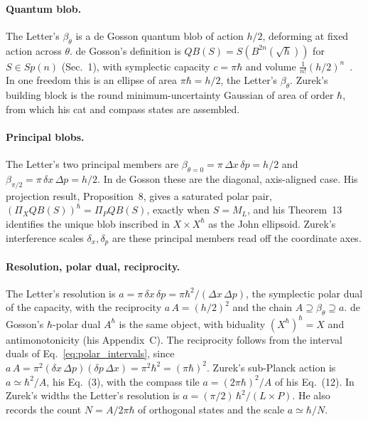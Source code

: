 \documentclass[%
  aps, amsmath, amssymb, onecolumn, 11pt
]{revtex4-2}
\begin{document}
\paragraph{Quantum blob.}
The Letter's $\beta_\theta$ is a de Gosson quantum blob of action $h/2$,
deforming at fixed action across $\theta$. de Gosson's definition is
$QB(S)=S(B^{2n}(\sqrt{\hbar}))$ for $S\in Sp(n)$ (Sec.~1), with symplectic
capacity $c=\pi\hbar$ and volume $\tfrac{1}{n!}(h/2)^n$~\cite{degosson2013qblobs}.
In one freedom this is an ellipse of area $\pi\hbar=h/2$, the Letter's $\beta_\theta$.
Zurek's building block is the round minimum-uncertainty Gaussian of area of order $\hbar$, from which his cat and compass
states are assembled.

\paragraph{Principal blobs.}
The Letter's two principal members are
$\beta_{\theta=0}=\pi\,\Delta x\,\delta p=h/2$ and
$\beta_{\pi/2}=\pi\,\delta x\,\Delta p=h/2$. In de Gosson these are the
diagonal, axis-aligned case. His projection result, Proposition~8, gives a
saturated polar pair, $(\Pi_X QB(S))^\hbar=\Pi_P QB(S)$, exactly when
$S=M_L$, and his Theorem~13 identifies the unique blob inscribed in
$X\times X^\hbar$ as the John ellipsoid. Zurek's interference scales
$\delta_x,\delta_p$ are these principal members read off the coordinate
axes.

\paragraph{Resolution, polar dual, reciprocity.}
The Letter's resolution is
$a=\pi\,\delta x\,\delta p=\pi\hbar^2/(\Delta x\,\Delta p)$, the
symplectic polar dual of the capacity, with the reciprocity
$a\,A=(h/2)^2$ and the chain $A\supseteq \beta_\theta\supseteq a$.
de Gosson's $\hbar$-polar dual $A^\hbar$ is the same object, with
biduality $(X^\hbar)^\hbar=X$ and antimonotonicity (his Appendix~C).
The reciprocity follows from the interval duals of
Eq.~\eqref{eq:polar_intervals}, since
$a\,A=\pi^2(\delta x\,\Delta p)(\delta p\,\Delta x)=\pi^2\hbar^2=(\pi\hbar)^2$.
Zurek's sub-Planck action is $a\simeq\hbar^2/A$, his Eq.~(3), with the
compass tile $a=(2\pi\hbar)^2/A$ of his Eq.~(12). In Zurek's widths the
Letter's resolution is $a=(\pi/2)\,\hbar^2/(L\times P)$. He also
records the count $N=A/2\pi\hbar$ of orthogonal states and the scale
$a\simeq\hbar/N$.
\end{document}
